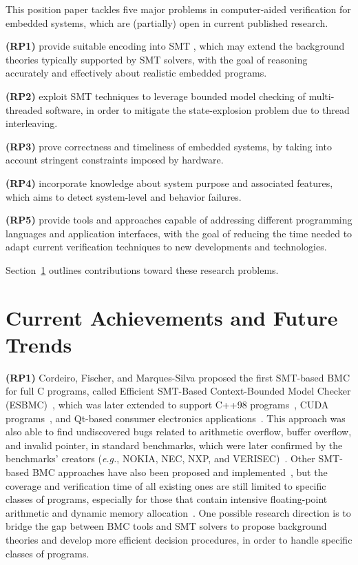 \documentclass{acm_sen_article}
\begin{document}
This position paper tackles five major problems in computer-aided verification for embedded systems, which are (partially) open in current published research.

\textbf{(RP1)} provide suitable encoding into SMT \cite{BarrettSST09}, which may extend the background theories typically supported by SMT solvers, with the goal of reasoning accurately and effectively about realistic embedded programs.

\textbf{(RP2)} exploit SMT techniques to leverage bounded model checking of multi-threaded software, in order to mitigate the state-explosion problem due to thread interleaving.
	
\textbf{(RP3)} prove correctness and timeliness of embedded systems, by taking into account stringent constraints imposed by hardware.
	
\textbf{(RP4)} incorporate knowledge about system purpose and associated features, which aims to detect system-level and behavior failures.

\textbf{(RP5)} provide tools and approaches capable of addressing different programming languages and application interfaces, with the goal of reducing the time needed to adapt current verification techniques to new developments and technologies.

Section~\ref{achievements} outlines contributions toward these research problems.

\section{Current Achievements and Future Trends}
\label{achievements}

\textbf{(RP1)} Cordeiro, Fischer, and Marques-Silva proposed the first SMT-based BMC for full C programs, called Efficient SMT-Based Context-Bounded Model Checker (ESBMC)~\cite{Cordeiro12}, which was later extended to support C++98 programs~\cite{ECBS13}, CUDA programs~\cite{Pereira15}, and Qt-based consumer electronics applications~\cite{Sousa15}. This approach was also able to find undiscovered bugs related to arithmetic overflow, buffer overflow, and invalid pointer, in standard benchmarks, which were later confirmed by the benchmarks' creators ({\it e.g.}, NOKIA, NEC, NXP, and VERISEC)~\cite{CordeiroF11,Cordeiro12}. Other SMT-based BMC approaches have also been proposed and implemented~\cite{MerzFS12}, but the coverage and verification time of all existing ones are still limited to specific classes of programs, especially for those that contain intensive floating-point arithmetic and dynamic memory allocation~\cite{Beyer14,BeyerSVCOMP15}. One possible research direction is to bridge the gap between BMC tools and SMT solvers to propose background theories and develop more efficient decision procedures, in order to handle specific classes of programs.
\end{document}
